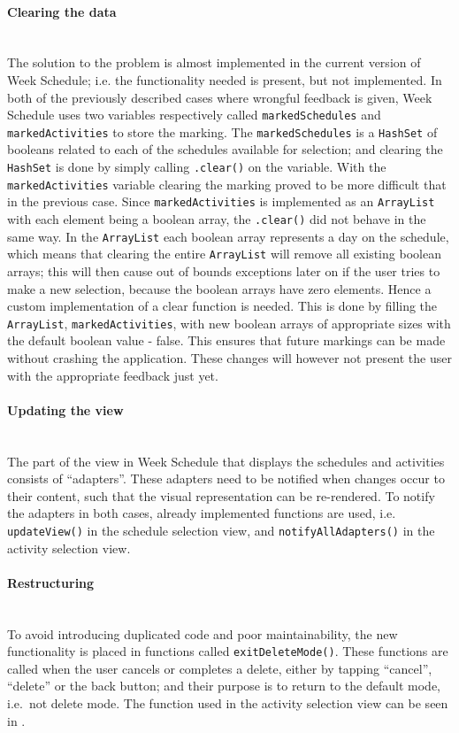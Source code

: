 \paragraph{Clearing the data}\hfill\\
The solution to the problem is almost implemented in the current version of Week Schedule; i.e. the functionality needed is present, but not implemented.
In both of the previously described cases where wrongful feedback is given, Week Schedule uses two variables respectively called \texttt{markedSchedules} and \texttt{markedActivities} to store the marking.
The \texttt{markedSchedules} is a \texttt{HashSet} of booleans related to each of the schedules available for selection; and clearing the \texttt{HashSet} is done by simply calling \texttt{.clear()} on the variable.
With the \texttt{markedActivities} variable clearing the marking proved to be more difficult that in the previous case.
Since \texttt{markedActivities} is implemented as an \texttt{ArrayList} with each element being a boolean array, the \texttt{.clear()} did not behave in the same way.
In the \texttt{ArrayList} each boolean array represents a day on the schedule, which means that clearing the entire \texttt{ArrayList} will remove all existing boolean arrays; this will then cause out of bounds exceptions later on if the user tries to make a new selection, because the boolean arrays have zero elements. 
Hence a custom implementation of a clear function is needed.
This is done by filling the \texttt{ArrayList}, \texttt{markedActivities}, with new boolean arrays of appropriate sizes with the default boolean value - false.
This ensures that future markings can be made without crashing the application.
These changes will however not present the user with the appropriate feedback just yet.

\paragraph{Updating the view}\hfill\\
The part of the view in Week Schedule that displays the schedules and activities consists of \enquote{adapters}.
These adapters need to be notified when changes occur to their content, such that the visual representation can be re-rendered.
To notify the adapters in both cases, already implemented functions are used, i.e. \texttt{updateView()} in the schedule selection view, and \texttt{notifyAllAdapters()} in the activity selection view.

\paragraph{Restructuring} \hfill\\
To avoid introducing duplicated code and poor maintainability, the new functionality is placed in functions called \texttt{exitDeleteMode()}.
These functions are called when the user cancels or completes a delete, either by tapping \enquote{cancel}, \enquote{delete} or the back button;
and their purpose is to return to the default mode, i.e.\ not delete mode.
The function used in the activity selection view can be seen in .


